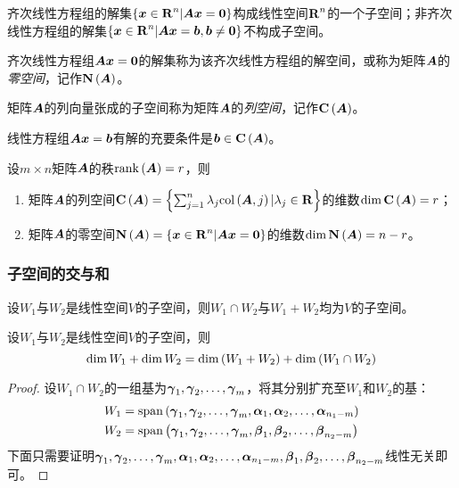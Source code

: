 \documentclass{ctexart}
\begin{document}
\begin{theorem}
    齐次线性方程组的解集\(\setof{\vecx\in\rea^n|\mata\vecx=\veczero}\)构成线性空间\(\rea^n\)的一个子空间；非齐次线性方程组的解集\(\setof{\vecx\in\rea^n|\mata\vecx=\vecb,\vecb\neq\veczero}\)不构成子空间。
\end{theorem}

\begin{definition}[零空间]
    齐次线性方程组\(\mata\vecx=\veczero\)的解集称为该齐次线性方程组的解空间，或称为矩阵\(\mata\)的\emph{零空间}，记作\(\nullsp{\mata}\)。
\end{definition}

\begin{definition}[列空间]
    矩阵\(\mata\)的列向量张成的子空间称为矩阵\(\mata\)的\emph{列空间}，记作\(\colsp{\mata}\)。
\end{definition}

\begin{theorem}
    线性方程组\(\mata\vecx=\vecb\)有解的充要条件是\(\vecb\in\colsp{\mata}\)。
\end{theorem}

\begin{theorem}
    设\(m\times n\)矩阵\(\mata\)的秩\(\rank{\mata}=r\)，则
    \begin{enumerate}
        \item 矩阵\(\mata\)的列空间\(\colsp{\mata}=\setof{\sum_{j=1}^n\lambda_j\col{\mata}{j}|\lambda_j\in\rea}\)的维数\(\dim{\colsp{\mata}}=r\)；
        \item 矩阵\(\mata\)的零空间\(\nullsp{\mata}=\setof{\vecx\in\rea^n|\mata\vecx=\veczero}\)的维数\(\dim{\nullsp{\mata}}=n-r\)。
    \end{enumerate}
\end{theorem}

\subsubsection*{子空间的交与和}

\begin{theorem}
    设\(W_1\)与\(W_2\)是线性空间\(V\)的子空间，则\(W_1\cap W_2\)与\(W_1+W_2\)均为\(V\)的子空间。
\end{theorem}

\begin{theorem}[维数公式]
    设\(W_1\)与\(W_2\)是线性空间\(V\)的子空间，则
    \begin{equation*}
        \dim W_1+\dim W_2=\dim\mypar{W_1+W_2}+\dim\mypar{W_1\cap W_2}
    \end{equation*}
\end{theorem}
\begin{proof}
    设\(W_1\cap W_2\)的一组基为\(\enums{\vecgamma}{m}\)，将其分别扩充至\(W_1\)和\(W_2\)的基：
    \begin{align*}
        W_1 & =\myspan{\enums{\vecgamma}{m},\enums{\vecal}{n_1-m}}   \\
        W_2 & =\myspan{\enums{\vecgamma}{m},\enums{\vecbeta}{n_2-m}} \\
    \end{align*}
    下面只需要证明\(\enums{\vecgamma}{m},\enums{\vecal}{n_1-m},\enums{\vecbeta}{n_2-m}\)线性无关即可。
\end{proof}
\end{document}

